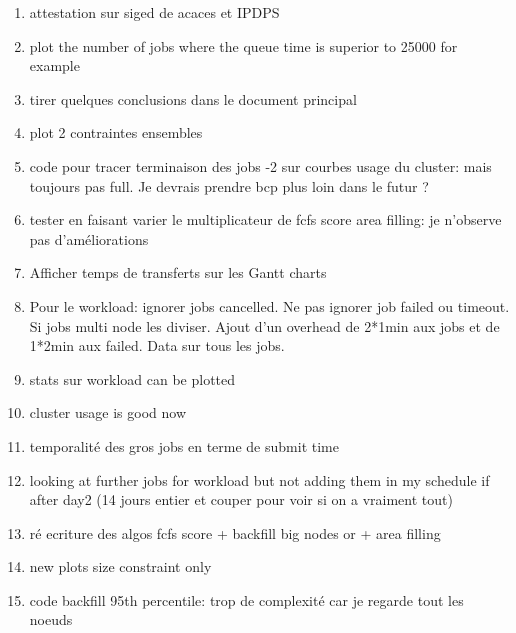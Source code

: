 \documentclass[a4paper]{article}
\begin{document}
\begin{enumerate}
		\item attestation sur siged de acaces et IPDPS
		\item plot the number of jobs where the queue time is superior to 25000 for example
		\item tirer quelques conclusions dans le document principal
		\item plot 2 contraintes ensembles
		\item code pour tracer terminaison des jobs -2 sur courbes usage du cluster: mais toujours pas full. Je devrais prendre bcp plus loin dans le futur ?
		\item tester en faisant varier le multiplicateur de fcfs score area filling: je n'observe pas d'améliorations
		\item Afficher temps de transferts sur les Gantt charts
		
		\item Pour le workload: ignorer jobs cancelled. Ne pas ignorer job failed ou timeout. Si jobs multi node les diviser. Ajout d'un overhead de 2*1min aux jobs et de 1*2min aux failed. Data sur tous les jobs.
		\item stats sur workload can be plotted
		\item cluster usage is good now
		\item temporalité des gros jobs en terme de submit time
		\item looking at further jobs for workload but not adding them in my schedule if after day2 (14 jours entier et couper pour voir si on a vraiment tout)
		\item ré ecriture des algos fcfs score + backfill big nodes or + area filling
		\item new plots size constraint only
		\item code backfill 95th percentile: trop de complexité car je regarde tout les noeuds


\end{enumerate}
\end{document}
